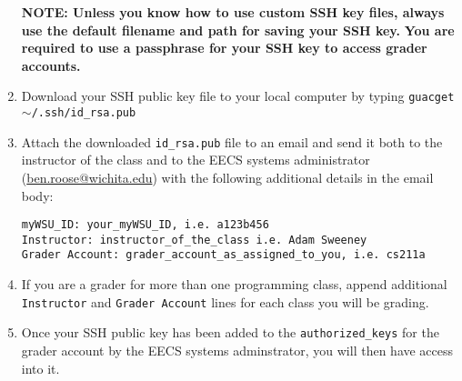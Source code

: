 \documentclass[12pt]{article}
\begin{document}
\begin{flushleft}
\begin{enumerate}
      \textbf{NOTE: Unless you know how to use custom SSH key files, always use the default filename and path for saving your SSH key.} \break
      \textbf{You are required to use a passphrase for your SSH key to access grader accounts.}
    
  \item Download your SSH public key file to your local computer by typing \break
  \texttt{guacget $\sim$/.ssh/id\_rsa.pub}
  \item Attach the downloaded \texttt{id\_rsa.pub} file to an email and send it both to the instructor of the class and to the EECS systems administrator (\href{mailto:ben.roose@wichita.edu}{ben.roose@wichita.edu}) with the following additional details in the email body:
\begin{verbatim}
myWSU_ID: your_myWSU_ID, i.e. a123b456
Instructor: instructor_of_the_class i.e. Adam Sweeney
Grader Account: grader_account_as_assigned_to_you, i.e. cs211a
\end{verbatim}
  \item If you are a grader for more than one programming class, append additional \texttt{Instructor} and \texttt{Grader Account} lines for each class you will be grading.
 \item Once your SSH public key has been added to the \texttt{authorized\_keys} for the grader account by the EECS systems adminstrator, you will then have access into it.
\end{enumerate}



\end{flushleft}
\end{document}
